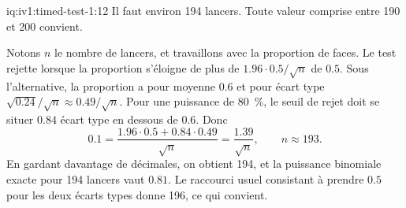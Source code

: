 \begin{solution}{iq:iv1:timed-test-1:12}
Il faut environ 194 lancers. Toute valeur comprise entre 190 et 200 convient.

Notons $n$ le nombre de lancers, et travaillons avec la proportion de faces. Le test rejette lorsque la proportion s'éloigne de plus de $1.96 \cdot 0.5/\sqrt n$ de $0.5$. Sous l'alternative, la proportion a pour moyenne $0.6$ et pour écart type $\sqrt{0.24}/\sqrt n \approx 0.49/\sqrt n$. Pour une puissance de 80~\%, le seuil de rejet doit se situer $0.84$ écart type en dessous de $0.6$. Donc
\[
0.1 = \frac{1.96 \cdot 0.5 + 0.84 \cdot 0.49}{\sqrt n} = \frac{1.39}{\sqrt n}, \qquad n \approx 193 .
\]
En gardant davantage de décimales, on obtient 194, et la puissance binomiale exacte pour 194 lancers vaut $0.81$. Le raccourci usuel consistant à prendre $0.5$ pour les deux écarts types donne 196, ce qui convient.

\end{solution}
